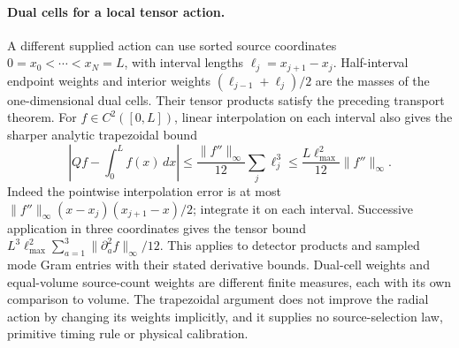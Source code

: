 \paragraph{Dual cells for a local tensor action.}
A different supplied action can use sorted source coordinates
$0=x_0<\cdots<x_N=L$, with interval lengths $\ell_j=x_{j+1}-x_j$.
Half-interval endpoint weights and interior weights
$(\ell_{j-1}+\ell_j)/2$ are the masses of the one-dimensional dual cells.
Their tensor products satisfy the preceding transport theorem. For
$f\in C^2([0,L])$, linear interpolation on each interval also gives
the sharper analytic trapezoidal bound
\[
 \left|Qf-\int_0^L f(x)\,dx\right|
 \le\frac{\|f''\|_\infty}{12}\sum_j\ell_j^3
 \le\frac{L\ell_{\max}^2}{12}\|f''\|_\infty.
\]
Indeed the pointwise interpolation error is at most
$\|f''\|_\infty(x-x_j)(x_{j+1}-x)/2$; integrate it on each interval.
Successive application in three coordinates gives the tensor bound
$L^3\ell_{\max}^2\sum_{a=1}^3\|\partial_a^2f\|_\infty/12$.
This applies to detector products and sampled mode Gram entries with their
stated derivative bounds. Dual-cell weights and equal-volume source-count
weights are different finite measures, each with its own comparison to
volume. The trapezoidal argument does not improve the radial action by
changing its weights implicitly, and it supplies no source-selection law,
primitive timing rule or physical calibration.
